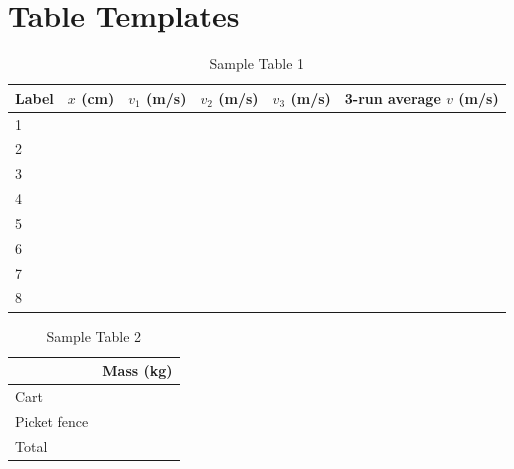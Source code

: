 \section{Table Templates}
%
\begin{table}[ht!]
    \begin{center}
        \begin{tabular}{l | l | l | l | l | l}
            \textbf{Label} & $x$ (cm) & $v_{1}$ (m/s) & $v_{2}$ (m/s) & $v_{3}$ (m/s) & 3-run average $v$ (m/s) \\
            \hline
            1 & & & & & \\
            2 & & & & & \\
            3 & & & & & \\
            4 & & & & & \\
            5 & & & & & \\
            6 & & & & & \\
            7 & & & & & \\
            8 & & & & & \\
            \hline
        \end{tabular}
    \end{center}
    \caption{Sample Table 1}
\end{table}
%
\begin{table}[ht!]
    \begin{center}
        \begin{tabular}{l | l}
            & \textbf{Mass} (kg) \\
            \hline
            Cart & \\
            Picket fence & \\
            \hline
            Total & \\
            \hline
        \end{tabular}
    \end{center}
    \caption{Sample Table 2}
\end{table}
%
\newpage
